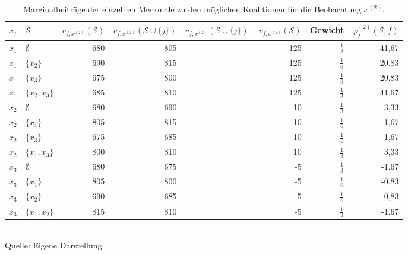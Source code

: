 \begin{table}[!h]
    \caption{Marginalbeiträge der einzelnen Merkmale zu den möglichen Koalitionen für die Beobachtung $x^{(2)}$.}
    \footnotesize
    \begin{tabularx}{\textwidth}{XXrrrrr}
    \toprule
    $x_{j}$ & $\mathcal{S}$ & $v_{f, x^{(2)}}(\mathcal{S})$ & $v_{f, x^{(2)}}(\mathcal{S} \cup \{j\})$ & $v_{f, x^{(2)}}(\mathcal{S} \cup \{j\}) - v_{f, x^{(2)}}(\mathcal{S})$ & Gewicht & $\varphi_{j}^{(2)}(\mathcal{S}, f)$\\
    \midrule
    $x_1$ & $\emptyset$ & 680 & 805 & 125 & $\frac{1}{3}$ & 41,67 \\
    $x_1$ & $\{x_2\}$ & 690 & 815 & 125 & $\frac{1}{6}$ & 20.83 \\
    $x_1$ & $\{x_3\}$ & 675 & 800 & 125 & $\frac{1}{6}$ & 20.83 \\
    $x_1$ & $\{x_2, x_3\}$ & 685 & 810 & 125 & $\frac{1}{3}$ & 41,67 \\
    $x_2$ & $\emptyset$ & 680 & 690 & 10 & $\frac{1}{3}$ & 3,33 \\
    $x_2$ & $\{x_1\}$ & 805 & 815 & 10 & $\frac{1}{6}$ & 1,67 \\
    $x_2$ & $\{x_3\}$ & 675 & 685 & 10 & $\frac{1}{6}$ & 1,67 \\
    $x_2$ & $\{x_1, x_3\}$ & 800 & 810 & 10 & $\frac{1}{3}$ & 3,33 \\
    $x_3$ & $\emptyset$ & 680 & 675 & -5 & $\frac{1}{3}$ & -1,67 \\
    $x_3$ & $\{x_1\}$ & 805 & 800 & -5 & $\frac{1}{6}$ & -0,83 \\
    $x_3$ & $\{x_2\}$ & 690 & 685 & -5 & $\frac{1}{6}$ & -0,83 \\
    $x_3$ & $\{x_1, x_2\}$ & 815 & 810 & -5 & $\frac{1}{3}$ & -1,67 \\
    \bottomrule
    \end{tabularx}
    \label{tab:shapley_marginal_features_x2}
    \normalsize\\
    Quelle: Eigene Darstellung.
\end{table}

